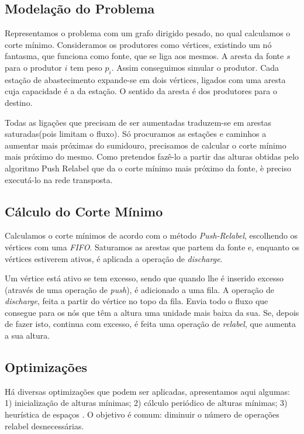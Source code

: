 \documentclass[a4paper, 12pt, conference, portuguese]{ieeeconf}
\begin{document}
\subsection{Modelação do Problema}

Representamos o problema com um grafo dirigido pesado, no qual
calculamos o corte mínimo. Consideramos os produtores como
vértices, existindo um nó fantasma, que funciona como fonte, que
se liga aos mesmos. A aresta da fonte $s$ para o produtor $i$ tem
peso $p_i$. Assim conseguimos simular o produtor. Cada estação de
abastecimento expande-se em dois vértices, ligados com uma aresta
cuja capacidade é a da estação. O sentido da aresta é dos produtores
para o destino.

Todas as ligações que precisam de ser aumentadas traduzem-se em arestas
saturadas(pois limitam o fluxo). Só procuramos as estações e
caminhos a aumentar mais próximas do sumidouro, precisamos de calcular
o corte mínimo mais próximo do mesmo. Como pretendos fazê-lo a partir
das alturas obtidas pelo algoritmo Push Relabel que da o corte mínimo
mais próximo da fonte, è preciso executá-lo na rede transposta.

\subsection{Cálculo do Corte Mínimo}
Calculamos o corte mínimos de acordo com o método
\textit{Push-Relabel}\cite{pre-flow}, escolhendo os vértices com
uma \textit{FIFO}. Saturamos as arestas que
partem da fonte e, enquanto os vértices estiverem ativos, é
aplicada a operação de \textit{discharge}.

Um vértice está ativo se tem excesso, sendo que quando lhe é
inserido excesso (através de uma operação de \textit{push}), é adicionado
a uma fila. A operação de \textit{discharge}, feita a partir do vértice
no topo da fila. Envia todo o fluxo que consegue para os nós que
têm a altura uma unidade mais baixa da sua. Se, depois de fazer
isto, continua com excesso, é feita uma operação de
\textit{relabel}, que aumenta a sua altura.

\subsection{Optimizações}

Há diversas optimizações que podem ser aplicadas, apresentamos
aqui algumas: 1) inicialização de alturas mínimas; 2) cálculo
periódico de alturas mínimas; 3) heurística de espaços .
O objetivo é comum: diminuir o número de operações relabel desnecessárias.
\end{document}
